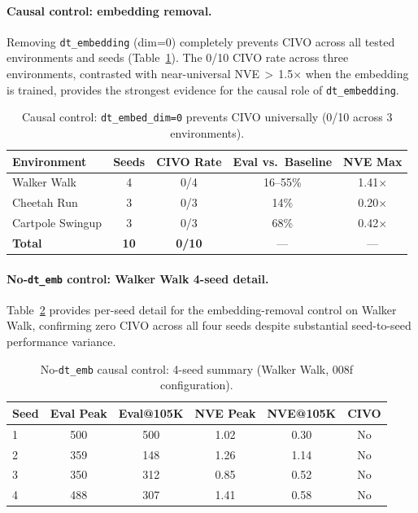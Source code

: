 \documentclass{article}
\begin{document}
\paragraph{Causal control: embedding removal.}
Removing \texttt{dt\_embedding} (dim=0) completely prevents CIVO across all tested environments and seeds (Table~\ref{tab:no-dtemb-causal}).
The 0/10 CIVO rate across three environments, contrasted with near-universal NVE\,$>$\,1.5$\times$ when the embedding is trained, provides the strongest evidence for the causal role of \texttt{dt\_embedding}.

\begin{table}[h]
\centering
\caption{Causal control: \texttt{dt\_embed\_dim=0} prevents CIVO universally (0/10 across 3 environments).}
\label{tab:no-dtemb-causal}
\begin{tabular}{lcccc}
\toprule
\textbf{Environment} & \textbf{Seeds} & \textbf{CIVO Rate} & \textbf{Eval vs.\ Baseline} & \textbf{NVE Max} \\
\midrule
Walker Walk & 4 & 0/4 & 16--55\% & 1.41$\times$ \\
Cheetah Run & 3 & 0/3 & 14\% & 0.20$\times$ \\
Cartpole Swingup & 3 & 0/3 & 68\% & 0.42$\times$ \\
\midrule
\textbf{Total} & \textbf{10} & \textbf{0/10} & --- & --- \\
\bottomrule
\end{tabular}
\end{table}

\paragraph{No-\texttt{dt\_emb} control: Walker Walk 4-seed detail.}
Table~\ref{tab:008f-seeds} provides per-seed detail for the embedding-removal control on Walker Walk, confirming zero CIVO across all four seeds despite substantial seed-to-seed performance variance.

\begin{table}[h]
\centering
\caption{No-\texttt{dt\_emb} causal control: 4-seed summary (Walker Walk, 008f configuration).}
\label{tab:008f-seeds}
\begin{tabular}{lccccc}
\toprule
\textbf{Seed} & \textbf{Eval Peak} & \textbf{Eval@105K} & \textbf{NVE Peak} & \textbf{NVE@105K} & \textbf{CIVO} \\
\midrule
1 & 500 & 500 & 1.02 & 0.30 & No \\
2 & 359 & 148 & 1.26 & 1.14 & No \\
3 & 350 & 312 & 0.85 & 0.52 & No \\
4 & 488 & 307 & 1.41 & 0.58 & No \\
\bottomrule
\end{tabular}
\end{table}
\end{document}

